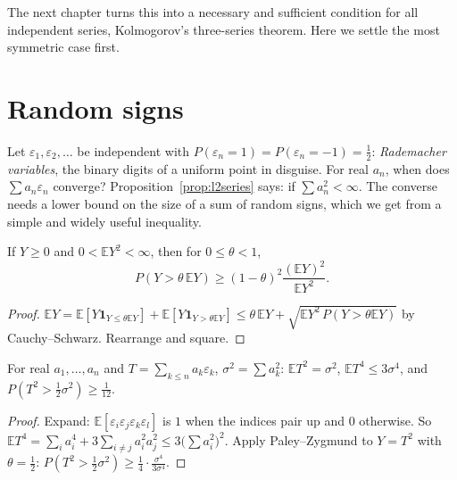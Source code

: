 The next chapter turns this into a necessary and sufficient condition for all independent series, Kolmogorov's three-series
theorem. Here we settle the most symmetric case first.

\section{Random signs}

Let $\varepsilon_1,\varepsilon_2,\dots$ be independent with $P(\varepsilon_n=1)=P(\varepsilon_n=-1)=\frac12$: \emph{Rademacher
variables}, the binary digits of a uniform point in disguise. For real $a_n$, when does $\sum a_n\varepsilon_n$ converge?
Proposition~\ref{prop:l2series} says: if $\sum a_n^2<\infty$. The converse needs a lower bound on the size of a sum of random
signs, which we get from a simple and widely useful inequality.

\begin{lemma}\label{lem:pz}
If $Y\ge0$ and $0<\mathbb E Y^2<\infty$, then for $0\le\theta<1$,
\[
P(Y>\theta\,\mathbb E Y)\ge(1-\theta)^2\frac{(\mathbb E Y)^2}{\mathbb E Y^2}.
\]
\end{lemma}
\begin{proof}
$\mathbb E Y=\mathbb E[Y\mathbf 1_{Y\le\theta\mathbb E Y}]+\mathbb E[Y\mathbf 1_{Y>\theta\mathbb E Y}]\le\theta\,\mathbb E Y+
\sqrt{\mathbb E Y^2\,P(Y>\theta\mathbb E Y)}$ by Cauchy--Schwarz. Rearrange and square.
\end{proof}

\begin{lemma}\label{lem:radmoments}
For real $a_1,\dots,a_n$ and $T=\sum_{k\le n}a_k\varepsilon_k$, $\sigma^2=\sum a_k^2$: $\mathbb E T^2=\sigma^2$, $\mathbb E T^4\le3\sigma^4$,
and $P(T^2>\frac12\sigma^2)\ge\frac1{12}$.
\end{lemma}
\begin{proof}
Expand: $\mathbb E[\varepsilon_i\varepsilon_j\varepsilon_k\varepsilon_l]$ is $1$ when the indices pair up and $0$ otherwise. So
$\mathbb E T^4=\sum_ia_i^4+3\sum_{i\ne j}a_i^2a_j^2\le3\bigl(\sum a_i^2\bigr)^2$. Apply Paley--Zygmund to $Y=T^2$ with $\theta=\frac12$:
$P(T^2>\frac12\sigma^2)\ge\frac14\cdot\frac{\sigma^4}{3\sigma^4}$.
\end{proof}

